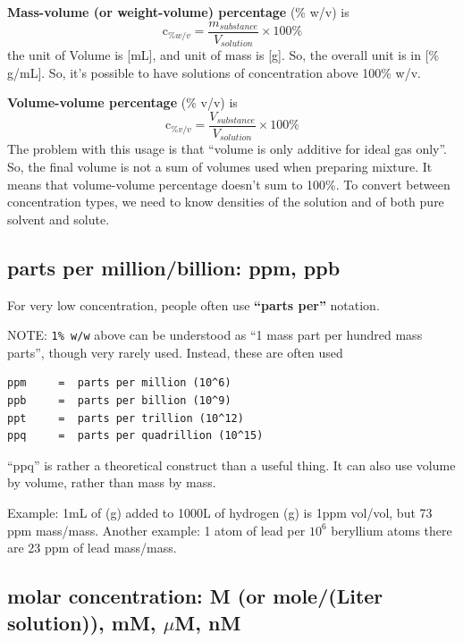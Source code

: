 {\bf Mass-volume (or weight-volume) percentage} (\% w/v) is
\begin{equation}
  \label{eq:1000}
  \text{c}_{\% w/v} = \frac{m_{substance}}{V_{solution}} \times 100\%
\end{equation}
the unit of Volume is [mL], and unit of mass is [g]. So, the overall
unit is in [\% g/mL]. So, it's possible to have solutions of
concentration above 100\% w/v. 



{\bf Volume-volume percentage} (\% v/v) is
\begin{equation}
  \label{eq:1001}
  \text{c}_{\% v/v} = \frac{V_{substance}}{V_{solution}} \times 100\%
\end{equation}
The problem with this usage is that ``volume is only additive for
ideal gas only''. So, the final volume is not a sum of volumes used
when preparing mixture. It means that volume-volume percentage doesn't
sum to 100\%. To convert between concentration types, we need to know
densities of the solution and of both pure solvent and solute. 


\subsection{parts per million/billion: ppm, ppb}

For very low concentration, people often use {\bf ``parts per''}
notation. 

NOTE: \verb!1% w/w! above can be understood as ``1 mass part per
hundred mass parts'', though very rarely used. Instead, these are
often used
\begin{verbatim}
ppm     =  parts per million (10^6)
ppb     =  parts per billion (10^9)
ppt     =  parts per trillion (10^12)
ppq     =  parts per quadrillion (10^15)
\end{verbatim}

``ppq'' is rather a theoretical construct than a useful thing. It can
also use volume by volume, rather than mass by mass. 

Example: 1mL of (g) added to 1000L of hydrogen (g) is 1ppm
vol/vol, but 73 ppm mass/mass. Another example: 1 atom of lead per $10^6$
beryllium atoms there are 23 ppm of lead mass/mass.

\subsection{molar concentration: M (or mole/(Liter solution)), mM, $\mu$M, nM}
\label{sec:concentration-Molar}

